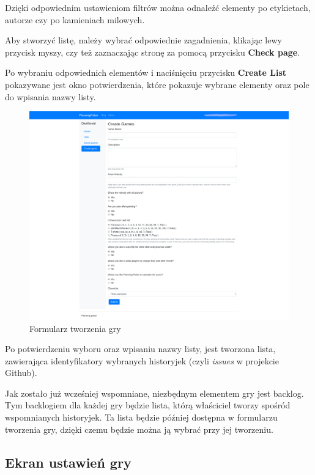 Dzięki odpowiednim ustawieniom filtrów można odnaleźć elementy po etykietach,
autorze czy po kamieniach milowych.

Aby stworzyć listę, należy wybrać odpowiednie zagadnienia, klikając lewy przycisk myszy,
czy też zaznaczając stronę za pomocą przycisku \textbf{Check page}.

Po wybraniu odpowiednich elementów i naciśnięciu przycisku \textbf{Create List}
pokazywane jest okno potwierdzenia,
które pokazuje wybrane elementy oraz pole do wpisania nazwy listy.

\begin{figure}[h]
	\centering\includegraphics[width=\textwidth]{img/Formularz}
	\caption{Formularz tworzenia gry}\label{rys:form}%
\end{figure}

Po potwierdzeniu wyboru oraz wpisaniu nazwy listy, jest tworzona lista, zawierająca
identyfikatory wybranych historyjek (czyli \textit{issues} w projekcie Github).

Jak zostało już wcześniej wspomniane, niezbędnym elementem gry jest backlog.
Tym backlogiem dla każdej gry będzie lista, którą właściciel tworzy spośród wspomnianych historyjek.
Ta lista będzie później dostępna w formularzu tworzenia gry,
dzięki czemu będzie można ją wybrać przy jej tworzeniu.


\subsection{Ekran ustawień gry}

